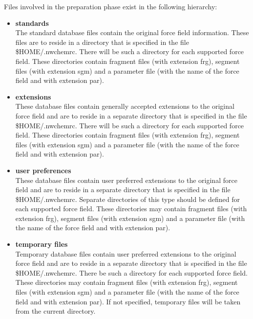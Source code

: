 Files involved in the preparation phase exist in the following hierarchy:
\begin{itemize}
\item[{\bf *}]
{\bf standards}\\
The standard database files contain the original force field information.
These files are to reside in a directory that is specified in the file 
\$HOME/.nwchemrc. There will be such a directory for each supported force 
field. These directories contain fragment files (with extension frg),
segment files (with extension sgm) and a parameter file (with the name
of the force field and with extension par).
\item[{\bf *}]
{\bf extensions}\\
These database files contain generally accepted extensions to the original
force field and are to reside in a separate directory that is specified in 
the file \$HOME/.nwchemrc. There will be such a directory for each supported 
force field. These directories contain fragment files (with extension frg),
segment files (with extension sgm) and a parameter file (with the name
of the force field and with extension par).
\item[{\bf *}]
{\bf user preferences}\\
These database files contain user preferred extensions to the original
force field and are to reside in a separate directory that is specified in 
the file \$HOME/.nwchemrc. Separate directories of this type  should be 
defined for each supported force field. 
These directories may contain fragment files (with extension frg),
segment files (with extension sgm) and a parameter file (with the name
of the force field and with extension par).
\item[{\bf *}]
{\bf temporary files}\\
Temporary database files contain user preferred extensions to the original
force field and are to reside in a separate directory that is specified in 
the file \$HOME/.nwchemrc. There  be such a directory for each supported 
force field. These directories may contain fragment files (with extension frg),
segment files (with extension sgm) and a parameter file (with the name
of the force field and with extension par). If not specified, temporary
files will be taken from the current directory.
\end{itemize}

